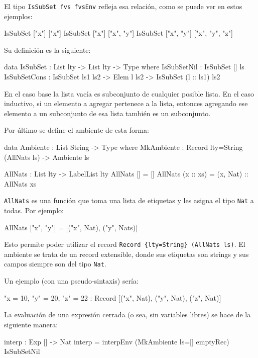 El tipo \texttt{IsSubSet fvs fvsEnv} refleja esa relación, como se puede ver en estos ejemplos:

\begin{code}
IsSubSet ["x"] ["x"]
IsSubSet ["x"] ["x", "y"]
IsSubSet ["x", "y"] ["x", "y", "z"]
\end{code}

Su definición es la siguiente:

\begin{code}
data IsSubSet : List lty -> List lty -> Type where
  IsSubSetNil : IsSubSet [] ls
  IsSubSetCons : IsSubSet ls1 ls2 -> Elem l ls2 ->
    IsSubSet (l :: ls1) ls2
\end{code}

En el caso base la lista vacía es subconjunto de cualquier posible lista. En el caso inductivo, si un elemento a agregar pertenece a la lista, entonces agregando ese elemento a un subconjunto de esa lista también es un subconjunto.

Por último se define el ambiente de esta forma:

\begin{code}
data Ambiente : List String -> Type where
  MkAmbiente : Record {lty=String} (AllNats ls) -> Ambiente ls

AllNats : List lty -> LabelList lty
AllNats [] = []
AllNats (x :: xs) = (x, Nat) :: AllNats xs
\end{code}

\texttt{AllNats} es una función que toma una lista de etiquetas y les asigna el tipo \texttt{Nat} a todas. Por ejemplo:

\begin{code}
AllNats ["x", "y"] = [("x", Nat), ("y", Nats)]
\end{code}

Esto permite poder utilizar el record \texttt{Record \{lty=String\} (AllNats ls)}. El ambiente se trata de un record extensible, donde sus etiquetas son strings y sus campos siempre son del tipo \texttt{Nat}.

Un ejemplo (con una pseudo-sintaxis) sería:

\begin{code}
{ "x = 10, "y" = 20, "z" = 22 } :
  Record [("x", Nat), ("y", Nat), ("z", Nat)]
\end{code}

La evaluación de una expresión cerrada (o sea, sin variables libres) se hace de la siguiente manera:

\begin{code}
interp : Exp [] -> Nat
interp = interpEnv (MkAmbiente {ls=[]} emptyRec) IsSubSetNil
\end{code}

